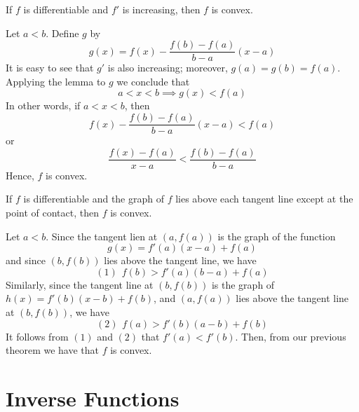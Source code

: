 \documentclass[12pt]{report}
\begin{document}
\begin{thm}{}{}
    If $f$ is differentiable and $f'$ is increasing, then $f$ is convex.
\end{thm}
\begin{proof*}{}{}
    Let $a < b$. Define $g$ by \begin{equation*}
        g(x) = f(x) - \frac{f(b) - f(a)}{b-a}(x-a)
    \end{equation*}
    It is easy to see that $g'$ is also increasing; moreover, $g(a) = g(b) = f(a)$. Applying the lemma to $g$ we conclude that $$a < x < b \implies g(x) < f(a)$$
    In other words, if $a < x < b$, then \begin{equation*}
        f(x) - \frac{f(b) - f(a)}{b-a}(x-a) < f(a)
    \end{equation*}
    or \begin{equation*}
        \frac{f(x) - f(a)}{x-a} < \frac{f(b) - f(a)}{b-a}
    \end{equation*}
    Hence, $f$ is convex.
\end{proof*}


\begin{thm}{}{}
    If $f$ is differentiable and the graph of $f$ lies above each tangent line except at the point of contact, then $f$ is convex.
\end{thm}
\begin{proof*}{}{}
    Let $a < b$. Since the tangent lien at $(a,f(a))$ is the graph of the function \begin{equation*}
        g(x) = f'(a)(x-a) + f(a)
    \end{equation*}
    and since $(b,f(b))$ lies above the tangent line, we have \begin{equation*}
        (1)\hspace{5pt}f(b) > f'(a)(b-a) + f(a)
    \end{equation*}
    Similarly, since the tangent line at $(b,f(b))$ is the graph of $h(x) =f'(b)(x-b) + f(b)$, and $(a,f(a))$ lies above the tangent line at $(b,f(b))$, we have \begin{equation*}
        (2)\hspace{5pt}f(a) > f'(b)(a-b) + f(b)
    \end{equation*}
    It follows from $(1)$ and $(2)$ that $f'(a) < f'(b)$. Then, from our previous theorem we have that $f$ is convex.
\end{proof*}



\section{Inverse Functions}
\end{document}
